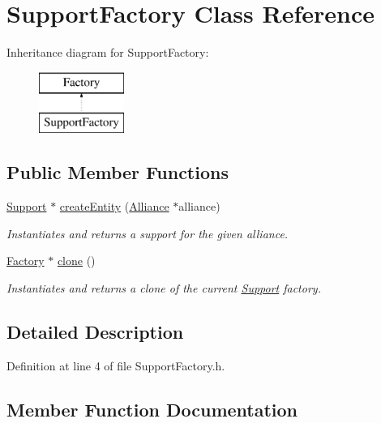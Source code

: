 \hypertarget{classSupportFactory}{}\section{Support\+Factory Class Reference}
\label{classSupportFactory}
Inheritance diagram for Support\+Factory\+:\begin{figure}[H]
\begin{center}
\leavevmode
\includegraphics[height=2.000000cm]{classSupportFactory}
\end{center}
\end{figure}
\subsection*{Public Member Functions}
\begin{DoxyCompactItemize}
\item 
\hyperlink{classSupport}{Support} $\ast$ \hyperlink{classSupportFactory_ae78e2f65e24d2ae2f73032bc465b879b}{create\+Entity} (\hyperlink{classAlliance}{Alliance} $\ast$alliance)
\begin{DoxyCompactList}\small\item\em Instantiates and returns a support for the given alliance. \end{DoxyCompactList}\item 
\hyperlink{classFactory}{Factory} $\ast$ \hyperlink{classSupportFactory_a802c25e901b479656ea95a5678a1ad26}{clone} ()
\begin{DoxyCompactList}\small\item\em Instantiates and returns a clone of the current \hyperlink{classSupport}{Support} factory. \end{DoxyCompactList}\end{DoxyCompactItemize}


\subsection{Detailed Description}


Definition at line 4 of file Support\+Factory.\+h.



\subsection{Member Function Documentation}
\mbox{\label{classSupportFactory_a802c25e901b479656ea95a5678a1ad26}} 
